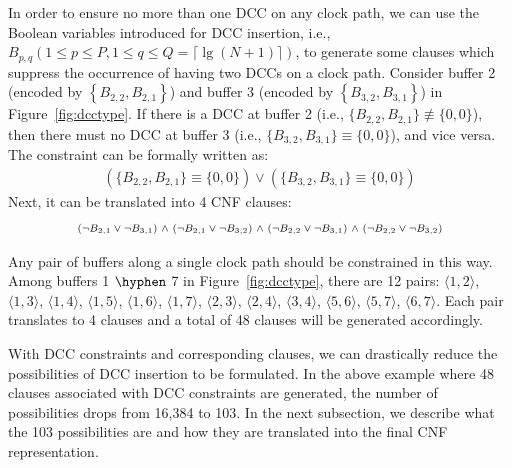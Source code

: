 In order to ensure no more than one DCC on any clock path, we can use the Boolean variables introduced for DCC insertion, i.e., $B_{p,q} \left(1 \leq p \leq P, 1 \leq q \leq Q = \lceil \lg (N + 1) \rceil \right)$, to generate some clauses which suppress the occurrence of having two DCCs on a clock path. Consider buffer 2 (encoded by $\left\{B_{2,2}, B_{2,1}\right\}$) and buffer 3 (encoded by $\left\{B_{3,2}, B_{3,1}\right\}$) in Figure~\ref{fig:dcctype}. If there is a DCC at buffer 2 (i.e., $\{B_{2,2}, B_{2,1}\} \not\equiv \{0, 0\}$), then there must no DCC at buffer 3 (i.e., $\{B_{3,2}, B_{3,1}\} \equiv \{0, 0\}$), and vice versa. The constraint can be formally written as:
\begin{gather*}
\left(\{B_{2,2}, B_{2,1}\} \equiv \{0, 0\}\right) \lor \left(\{B_{3,2}, B_{3,1}\} \equiv \{0, 0\}\right)
\end{gather*}
Next, it can be translated into 4 CNF clauses:
\begin{gather*}
\mbox{\fontsize{7}{8.4}\selectfont ($\neg B_{2,1}\lor\neg B_{3,1}$) $\land$ ($\neg B_{2,1}\lor\neg B_{3,2}$) $\land$ ($\neg B_{2,2}\lor\neg B_{3,1}$) $\land$ ($\neg B_{2,2}\lor\neg B_{3,2}$)} 
\end{gather*}

Any pair of buffers along a single clock path should be constrained in this way. Among buffers 1 $\hyphen$ 7 in Figure~\ref{fig:dcctype}, there are 12 pairs: $\langle1, 2\rangle$, $\langle1, 3\rangle$, $\langle1, 4\rangle$, $\langle1, 5\rangle$, $\langle1, 6\rangle$, $\langle1, 7\rangle$, $\langle2, 3\rangle$, $\langle2, 4\rangle$, $\langle3, 4\rangle$, $\langle5, 6\rangle$, $\langle5, 7\rangle$, $\langle6, 7\rangle$. Each pair translates to 4 clauses and a total of 48 clauses will be generated accordingly.

With DCC constraints and corresponding clauses, we can drastically reduce the possibilities of DCC insertion to be formulated. In the above example where 48 clauses associated with DCC constraints are generated, the number of possibilities drops from 16,384 to 103. In the next subsection, we describe what the 103 possibilities are and how they are translated into the final CNF representation.

